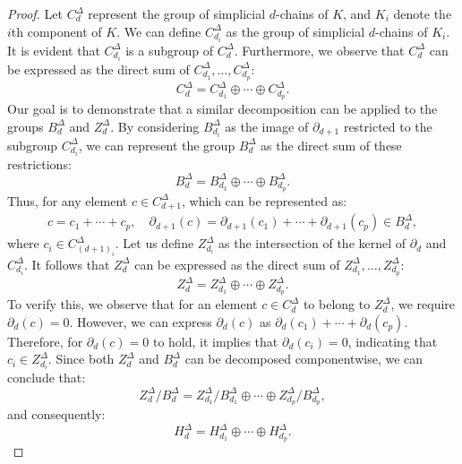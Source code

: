 \documentclass{amsart}
\begin{document}
\begin{proof}
Let $C^\Delta_d$ represent the group of simplicial $d$-chains of $K$, and $K_i$ denote the $i$th component of $K$. We can define $C^\Delta_{d_i}$ as the group of simplicial $d$-chains of $K_i$. It is evident that $C^\Delta_{d_i}$ is a subgroup of $C^\Delta_d$. Furthermore, we observe that $C^\Delta_d$ can be expressed as the direct sum of $C^\Delta_{d_1}, \ldots, C^\Delta_{d_p}$:
\begin{equation}
C^\Delta_d = C^\Delta_{d_1} \oplus \cdots \oplus C^\Delta_{d_p}.
\end{equation}
Our goal is to demonstrate that a similar decomposition can be applied to the groups $B^\Delta_d$ and $Z^\Delta_d$. By considering $B^\Delta_{d_i}$ as the image of $\partial_{d+1}$ restricted to the subgroup $C^\Delta_{d_i}$, we can represent the group $B^\Delta_d$ as the direct sum of these restrictions:
\begin{equation}
B^\Delta_d = B^\Delta_{d_1} \oplus \cdots \oplus B^\Delta_{d_p}.
\end{equation}
Thus, for any element $c \in C^\Delta_{d+1}$, which can be represented as:
\begin{align}
c = c_1 + \cdots + c_p, \quad \partial_{d+1}(c) = \partial_{d+1}(c_1) + \cdots + \partial_{d+1}(c_p) \in B^\Delta_d,
\end{align}
where $c_i \in C^\Delta_{{(d+1)}_i}$.
Let us define $Z^\Delta_{d_i}$ as the intersection of the kernel of $\partial_{d}$ and $C^\Delta_{d_i}$. It follows that $Z^\Delta_d$ can be expressed as the direct sum of $Z^\Delta_{d_1}, \ldots, Z^\Delta_{d_p}$:
\begin{equation}
Z^\Delta_d = Z^\Delta_{d_1} \oplus \cdots \oplus Z^\Delta_{d_p}.
\end{equation}
To verify this, we observe that for an element $c \in C^\Delta_d$ to belong to $Z^\Delta_d$, we require $\partial_{d}(c) = 0$. However, we can express $\partial_{d}(c)$ as $\partial_{d}(c_1) + \cdots + \partial_{d}(c_p)$. Therefore, for $\partial_{d}(c) = 0$ to hold, it implies that $\partial_{d}(c_i) = 0$, indicating that $c_i \in Z^\Delta_{d_i}$.
Since both $Z^\Delta_d$ and $B^\Delta_d$ can be decomposed componentwise, we can conclude that:
\begin{equation}
Z^\Delta_d / B^\Delta_d = Z^\Delta_{d_1} / B^\Delta_{d_1} \oplus \cdots \oplus Z^\Delta_{d_p} / B^\Delta_{d_p},
\end{equation}
and consequently:
\begin{equation}
H^\Delta_d = H^\Delta_{d_1} \oplus \cdots \oplus H^\Delta_{d_p}.
\end{equation}
\end{proof}
\end{document}
